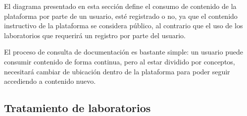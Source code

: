             El diagrama presentado en esta sección define el consumo de contenido de la plataforma por parte de un usuario, esté registrado o no, ya que el contenido instructivo de la plataforma se considera público, al contrario que el uso de los laboratorios que requerirá un registro por parte del usuario.
            
            El proceso de consulta de documentación es bastante simple: un usuario puede consumir contenido de forma continua, pero al estar dividido por conceptos, necesitará cambiar de ubicación dentro de la plataforma para poder seguir accediendo a contenido nuevo.
            
            \newpage
            
            
        \subsection{Tratamiento de laboratorios}
        
